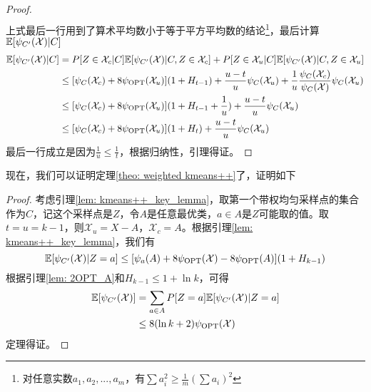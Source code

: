 \begin{proof}
\begin{align*}
    \end{align*}
    上式最后一行用到了算术平均数小于等于平方平均数的结论\footnote{对任意实数$a_1,a_2,...,a_m$，有$\sum a_i^2 \geq \frac{1}{m}(\sum a_i)^2$}，最后计算$\mathbb{E}[\psi_{C'}(\mathcal{X})|C]$
    \begin{align*}
        \mathbb{E}[\psi_{C'}(\mathcal{X})|C] &= P[Z \in \mathcal{X}_c|C] \mathbb{E}[\psi_{C'}(\mathcal{X})|C,Z \in \mathcal{X}_c] + P[Z \in \mathcal{X}_u|C] \mathbb{E}[\psi_{C'}(\mathcal{X})|C,Z \in \mathcal{X}_u] \\
            &\leq [\psi_{C}(\mathcal{X}_c)+8\psi_{\text{OPT}}(\mathcal{X}_u)](1+H_{t-1}) + \frac{u-t}{u}\psi_C(\mathcal{X}_u) + \frac{1}{u} \frac{\psi_C(\mathcal{X}_c)}{\psi_C(\mathcal{X})} \psi_C(\mathcal{X}_u) \\
            &\leq [\psi_{C}(\mathcal{X}_c)+8\psi_{\text{OPT}}(\mathcal{X}_u)](1+H_{t-1}+\frac{1}{u}) + \frac{u-t}{u}\psi_C(\mathcal{X}_u) \\
            &\leq [\psi_{C}(\mathcal{X}_c)+8\psi_{\text{OPT}}(\mathcal{X}_u)](1+H_{t}) + \frac{u-t}{u}\psi_C(\mathcal{X}_u)
    \end{align*}
    最后一行成立是因为$\frac{1}{u} \leq \frac{1}{t}$，根据归纳性，引理得证。
\end{proof}
现在，我们可以证明定理\ref{theo: weighted kmeans++}了，证明如下
\begin{proof}
    考虑引理\ref{lem: kmeans++_key_lemma}，取第一个带权均匀采样点的集合作为$C$，记这个采样点是$Z$，令$A$是任意最优类，$a\in A$是$Z$可能取的值。取$t=u=k-1$，则$\mathcal{X}_u = X - A$，$\mathcal{X}_c = A$。根据引理\ref{lem: kmeans++_key_lemma}，我们有
    \begin{equation*}
        \mathbb{E}[\psi_{C'}(\mathcal{X})|Z=a] \leq [\psi_a(A)+8\psi_{\text{OPT}}(\mathcal{X})-8\psi_{\text{OPT}}(A)](1+H_{k-1})
    \end{equation*}
    根据引理\ref{lem: 2OPT_A}和$H_{k-1} \leq 1 + \ln k$，可得
    \begin{align*}
        \mathbb{E}[\psi_{C'}(\mathcal{X})] &= \sum_{a \in A} P[Z=a] \mathbb{E}[\psi_{C'}(\mathcal{X})|Z=a] \\
        &\leq 8(\ln k +2)\psi_{\text{OPT}}(\mathcal{X})
    \end{align*}
    定理得证。
\end{proof}